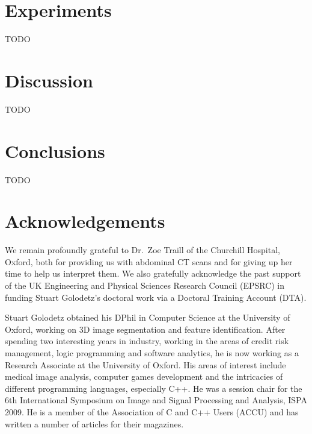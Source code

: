 \documentclass[10pt,twocolumn,twoside]{IEEEtran}
\begin{document}
\section{Experiments}
\label{sec:experiments}

TODO

\section{Discussion}
\label{sec:discussion}

TODO

\IEEEpubidadjcol

\section{Conclusions}
\label{sec:conclusions}

TODO

\section{Acknowledgements}

We remain profoundly grateful to Dr.\ Zoe Traill of the Churchill Hospital, Oxford, both for providing us with abdominal CT scans and for giving up her time to help us interpret them. We also gratefully acknowledge the past support of the UK Engineering and Physical Sciences Research Council (EPSRC) in funding Stuart Golodetz's doctoral work via a Doctoral Training Account (DTA).

\clearpage




\vspace{3cm}

\begin{IEEEbiography}{Stuart Golodetz}
obtained his DPhil in Computer Science at the University of Oxford, working on 3D image segmentation and feature identification. After spending two interesting years in industry, working in the areas of credit risk management, logic programming and software analytics, he is now working as a Research Associate at the University of Oxford. His areas of interest include medical image analysis, computer games development and the intricacies of different programming languages, especially C++. He was a session chair for the 6th International Symposium on Image and Signal Processing and Analysis, ISPA 2009. He is a member of the Association of C and C++ Users (ACCU) and has written a number of articles for their magazines.
\end{IEEEbiography}
\end{document}
